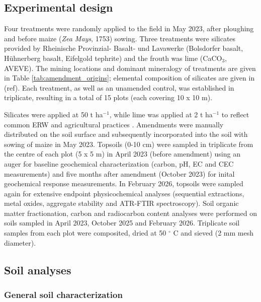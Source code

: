 \documentclass[preprint,12pt]{elsarticle}
\begin{document}
\subsection{Experimental design}
\label{subsec:experimental_design}

Four treatments were randomly applied to the field in May 2023, after ploughing and before maize (\textit{Zea Mays}, 1753) sowing. Three treatments were silicates provided by Rheinische Provinzial- Basalt- und Lavawerke (Bolsdorfer basalt, H\"uhnerberg basalt, Eifelgold tephrite) and the frouth was lime (CaCO$_3$, AVEVE). The mining locations and dominant mineralogy of treatments are given in Table \ref{tab:amendment_origins}; elemental composition of silicates are given in (ref). Each treatment, as well as an unamended control, was established in triplicate, resulting in a total of 15 plots (each covering 10 x 10 m). 
  
Silicates were applied at 50 t ha$^{-1}$, while lime was applied at 2 t ha$^{-1}$ to reflect common ERW and agricultural practices \citep{steinwidder2025beyond}. Amendments were manually distributed on the soil surface and subsequently incorporated into the soil with sowing of maize in May 2023. Topsoils (0-10 cm) were sampled in triplicate from the centre of each plot (5 x 5 m) in April 2023 (before amendment) using an auger for baseline geochemical characterization (carbon, pH, EC and CEC measurements) and five months after amendment (October 2023) for inital geochemical response measurements. In February 2026, topsoils were sampled again for extensive endpoint physicochemical analyses (sequential extractions, metal oxides, aggregate stability and ATR-FTIR spectroscopy). Soil organic matter fractionation, carbon and radiocarbon content analyses were performed on soils sampled in April 2023, October 2025 and February 2026. Triplicate soil samples from each plot were composited, dried at 50 $^\circ$ C and sieved (2 mm mesh diameter).
  
\subsection{Soil analyses}
\label{subsec:soil_analyses}

\subsubsection{General soil characterization}
  
\end{document}
